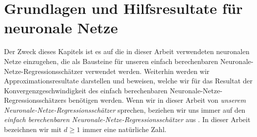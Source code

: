 \chapter{Grundlagen und Hilfsresultate für neuronale Netze}
\label{chap:1}

Der Zweck dieses Kapitels ist es auf die in dieser Arbeit verwendeten neuronalen Netze einzugehen, die als Bausteine für unseren einfach berechenbaren Neuronale-Netze-Regressionsschätzer verwendet werden. Weiterhin werden wir Approximationsresultate darstellen und beweisen, welche wir für das Resultat der Konvergenzgeschwindigkeit des einfach berechenbaren Neuronale-Netze-Regressionsschätzers benötigen werden. Wenn wir in dieser Arbeit von \emph{unserem Neuronale-Netze-Regressionsschätzer} sprechen, beziehen wir uns immer auf den \emph{einfach berechenbaren Neuronale-Netze-Regressionsschätzer} aus \cite{kohler19}. 
In dieser Arbeit bezeichnen wir mit $d \geq 1$ immer eine natürliche Zahl.

